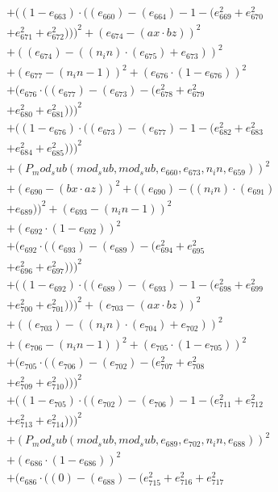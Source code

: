 \documentclass[10pt, a4paper]{article}
\begin{document}
\begin{align*}
& + ((1 - e_{663})  \cdot  ((e_{660}) - (e_{664}) - 1 - (e_{669}^{2} + e_{670}^{2} \\
& + e_{671}^{2} + e_{672}^{2})))^{2} + (e_{674} - (ax  \cdot  bz))^{2} \\
& + ((e_{674}) - ((n_in)  \cdot  (e_{675}) + e_{673}))^{2} \\
& + (e_{677} - (n_in - 1))^{2} + (e_{676}  \cdot  (1 - e_{676}))^{2} \\
& + (e_{676}  \cdot  ((e_{677}) - (e_{673}) - (e_{678}^{2} + e_{679}^{2} \\
& + e_{680}^{2} + e_{681}^{2})))^{2} \\
& + ((1 - e_{676})  \cdot  ((e_{673}) - (e_{677}) - 1 - (e_{682}^{2} + e_{683}^{2} \\
& + e_{684}^{2} + e_{685}^{2})))^{2} \\
& + (P_mod_sub(mod_sub, mod_sub, e_{660}, e_{673}, n_in, e_{659}))^{2} \\
& + (e_{690} - (bx  \cdot  az))^{2} + ((e_{690}) - ((n_in)  \cdot  (e_{691}) \\
& + e_{689}))^{2} + (e_{693} - (n_in - 1))^{2} \\
& + (e_{692}  \cdot  (1 - e_{692}))^{2} \\
& + (e_{692}  \cdot  ((e_{693}) - (e_{689}) - (e_{694}^{2} + e_{695}^{2} \\
& + e_{696}^{2} + e_{697}^{2})))^{2} \\
& + ((1 - e_{692})  \cdot  ((e_{689}) - (e_{693}) - 1 - (e_{698}^{2} + e_{699}^{2} \\
& + e_{700}^{2} + e_{701}^{2})))^{2} + (e_{703} - (ax  \cdot  bz))^{2} \\
& + ((e_{703}) - ((n_in)  \cdot  (e_{704}) + e_{702}))^{2} \\
& + (e_{706} - (n_in - 1))^{2} + (e_{705}  \cdot  (1 - e_{705}))^{2} \\
& + (e_{705}  \cdot  ((e_{706}) - (e_{702}) - (e_{707}^{2} + e_{708}^{2} \\
& + e_{709}^{2} + e_{710}^{2})))^{2} \\
& + ((1 - e_{705})  \cdot  ((e_{702}) - (e_{706}) - 1 - (e_{711}^{2} + e_{712}^{2} \\
& + e_{713}^{2} + e_{714}^{2})))^{2} \\
& + (P_mod_sub(mod_sub, mod_sub, e_{689}, e_{702}, n_in, e_{688}))^{2} \\
& + (e_{686}  \cdot  (1 - e_{686}))^{2} \\
& + (e_{686}  \cdot  ((0) - (e_{688}) - (e_{715}^{2} + e_{716}^{2} + e_{717}^{2} \\

\end{align*}
\end{document}
